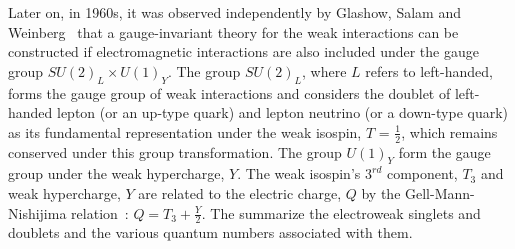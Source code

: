 Later on, in 1960s, it was observed independently by Glashow, Salam and Weinberg~\cite{Glashow:1961tr, Salam:1964ry, Weinberg:1967tq}
that a gauge-invariant theory for the weak interactions can be constructed if electromagnetic interactions are also included under the gauge group
${SU(2)}_{L} \times {U(1)}_{Y}$. The group ${SU(2)}_{L}$, where $L$ refers to left-handed,
forms the gauge group of weak interactions and considers the doublet of left-handed lepton (or an up-type quark)
and lepton neutrino (or a down-type quark) as its fundamental representation under the weak isospin, $T$ = $\frac{1}{2}$,
which remains conserved under this group transformation.
The group ${U(1)}_{Y}$ form the gauge group under the weak hypercharge, $Y$.  
The weak isospin's $3^{rd}$ component, $T_{3}$
and weak hypercharge, $Y$ are related to the electric charge, $Q$ by the Gell-Mann-Nishijima relation~\cite{Nakano:1953zz, Nishijima:1955zz, Gell-Mann:1956iqa}:
$Q = T_{3} + \frac{Y}{2}$. The \tab{\ref{tab:EWK_fermions}} summarize the electroweak singlets and doublets and the various quantum numbers associated with them.


